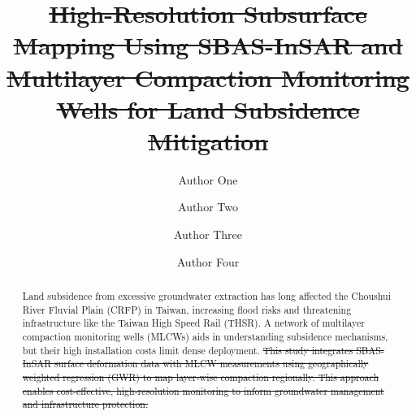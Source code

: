 \documentclass[a4paper,fleqn]{cas-dc}
\begin{document}
	\let\WriteBookmarks\relax
	\def\floatpagepagefraction{1}
	\def\textpagefraction{.001}
	
	
	
	\title [mode = title]{\st{High-Resolution Subsurface Mapping Using SBAS-InSAR and Multilayer Compaction Monitoring Wells for Land Subsidence Mitigation}}  
	
	\author[1]{Author One}
	\cormark[1] %
	
	\author[1]{Author Two}
	
	\author[2]{Author Three}
	
	\author[3]{Author Four}
	
	
	\begin{abstract}
		Land subsidence from excessive groundwater extraction has long affected the Choushui River Fluvial Plain (CRFP) in Taiwan, increasing flood risks and threatening infrastructure like the Taiwan High Speed Rail (THSR). A network of multilayer compaction monitoring wells (MLCWs) aids in understanding subsidence mechanisms, but their high installation costs limit dense deployment. \st{This study integrates SBAS-InSAR surface deformation data with MLCW measurements using geographically weighted regression (GWR) to map layer-wise compaction regionally. This approach enables cost-effective, high-resolution monitoring to inform groundwater management and infrastructure protection.}
	\end{abstract}
	
	
\end{document}
